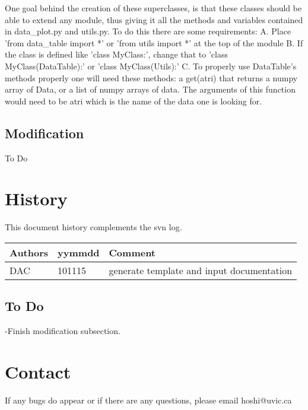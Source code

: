One goal behind the creation of these superclasses, is that these classes should be able to extend any module, thus giving it all the methods and variables contained in 
data\_plot.py and utils.py.  To do this there are some requirements:\newline
A. Place 'from data\_table import *' or 'from utils import *' at the top of the module\newline
B. If the class is defined like 'class MyClass:', change that to 
   'class MyClass(DataTable):' or 'class MyClass(Utils):'\newline
C. To properly use DataTable's methods properly one will need these methods:
	a get(atri) that returns a numpy array of Data, or a 
	list of numpy arrays of data.  The arguments of this function would need to be
	atri which is the name of the data one is looking for.\newline\newline

\subsection{Modification}
To Do
\section{History} 
This document history complements the svn log.

\begin{tabular*}{\textwidth}{lll}
\hline
Authors & yymmdd & Comment \\
\hline
DAC & 101115 & generate template and input documentation\\

\hline
\end{tabular*}
\subsection{To Do}
-Finish modification subsection.


\section{Contact}
If any bugs do appear or if there are any questions, please email hoshi@uvic.ca



